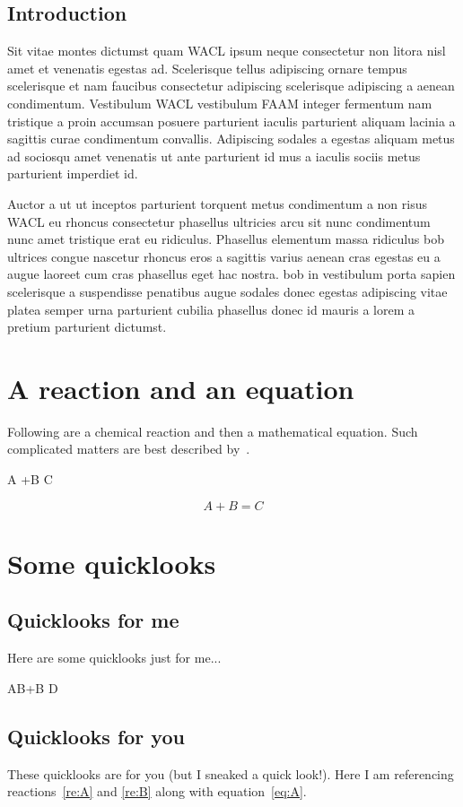 \documentclass{fsthesis}
\begin{document}
\section{Introduction}
Sit vitae montes dictumst quam \acrfull{WACL} ipsum neque consectetur non litora nisl amet et venenatis egestas ad. Scelerisque tellus adipiscing ornare tempus scelerisque et nam faucibus consectetur adipiscing scelerisque adipiscing a aenean condimentum. Vestibulum \acrshort{WACL} vestibulum \acrfull{FAAM} integer fermentum nam tristique a proin accumsan posuere parturient iaculis parturient aliquam lacinia a sagittis curae condimentum convallis. Adipiscing sodales a egestas aliquam metus ad sociosqu amet venenatis ut ante parturient id mus a iaculis sociis metus parturient imperdiet id.
\par
{\fontsize{20}{25}\selectfont Auctor a ut ut inceptos parturient} torquent metus condimentum a non risus \acrlong{WACL} eu rhoncus consectetur phasellus ultricies arcu sit nunc condimentum nunc amet tristique erat eu ridiculus. Phasellus elementum massa ridiculus \acrfull{bob} ultrices congue nascetur rhoncus eros a sagittis varius aenean cras egestas eu a augue laoreet cum cras phasellus eget hac nostra. \acrshort{bob} in vestibulum porta sapien scelerisque a suspendisse penatibus augue sodales donec egestas adipiscing vitae platea semper urna parturient cubilia phasellus donec id mauris a lorem a pretium parturient dictumst.




\appendix
\chapter{A reaction and an equation}
Following are a chemical reaction and then a mathematical equation. Such complicated matters are best described by~\citet{article-01}.
\begin{reaction}
\label{re:A}
A +B \rightarrow C
\end{reaction}
\begin{equation}
\label{eq:A}
A +B = C
\end{equation}

\chapter{Some quicklooks}
\section{Quicklooks for me}
Here are some quicklooks just for me...\citep{book-01}
\begin{reaction}
\label{re:B}
AB+B \rightarrow D
\end{reaction}

\section{Quicklooks for you}
These quicklooks are for you (but I sneaked a quick look!). Here I am referencing reactions~\ref{re:A} and \ref{re:B} along with equation~\ref{eq:A}.


\printglossary[type=\acronymtype]



\end{document}
